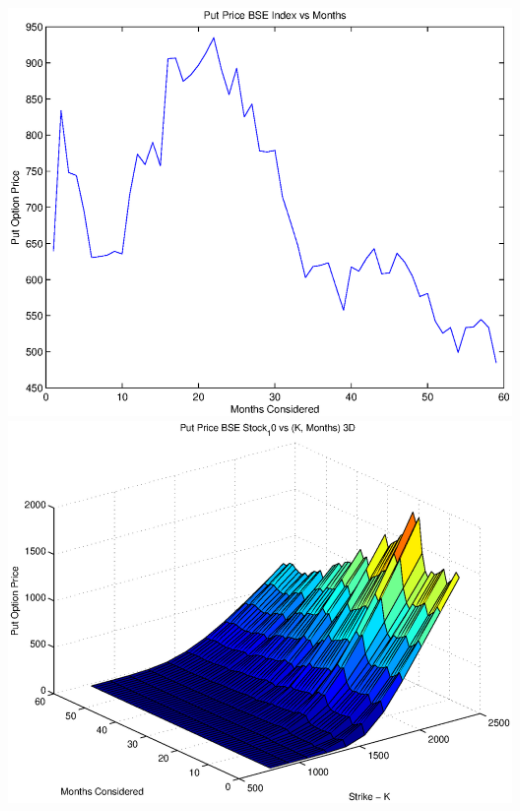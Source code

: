 \documentclass{article}
\begin{document}
\includegraphics[width=\textwidth]{Put_Price_BSE_Index_vs_Months} \\

\includegraphics[width=\textwidth]{Put_Price_BSE_Stock_10_vs_(K,_Months)_3D} \\
\end{document}
